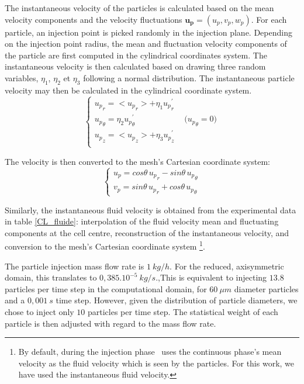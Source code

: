 \begin{itemize}
The instantaneous velocity of the particles is calculated based on the mean velocity components and the velocity fluctuations $\mathbf{u_p}=(u_p,v_p,w_p)$. For each particle, an injection point is picked randomly in the injection plane. Depending on the injection point radius, the mean and fluctuation velocity components of the particle are first computed in the cylindrical coordinates system. The instantaneous velocity is then calculated based on drawing three random variables, $\eta_1$, $\eta_2$ et $\eta_3$ following a normal distribution. The instantaneous particle velocity may then be calculated in the cylindrical coordinate system.
\begin{equation}
   \left\{\begin{array}{l}
      {u_p}_r=<{u_p}_r>+\eta_1 {u_p}_r^\prime \\
      {u_p}_\theta=\eta_2{u_p}_{\theta}^\prime\qquad\qquad\qquad
      \text{(${u_p}_\theta=0$)}               \\
      {u_p}_z=<{u_p}_z>+\eta_3{u_p}_z^\prime  \\
   \end{array}\right.
\end{equation}

The velocity is then converted to the mesh's Cartesian coordinate system:
\begin{equation}
   \left\{\begin{array}{l}
      u_p=cos\theta\, {u_p}_r- sin\theta\, {u_p}_\theta \\
      v_p=sin\theta\, {u_p}_r+ cos\theta\, {u_p}_\theta
   \end{array}\right.
\end{equation}

Similarly, the instantaneous fluid velocity is obtained from the experimental data in table \ref{CL_fluide}: interpolation of the fluid velocity mean and fluctuating components at the cell centre, reconstruction of the instantaneous velocity, and conversion to the mesh's Cartesian coordinate system \footnote{By default, during the injection phase \CS\ uses the continuous phase's mean velocity as the fluid velocity which is seen by the particles. For this work, we have used the instantaneous fluid velocity.}.

\noindent
The particle injection mass flow rate is $1~kg/h$. For the reduced, axisymmetric domain, this translates to $0,385.10^{-5}~kg/s$.,This is equivalent to injecting $13.8$ particles per time step in the computational domain, for $60~\mu m$ diameter particles and a $0,001~s$ time step. However, given the distribution of particle diameters, we chose to inject only $10$ particles per time step. The statistical weight of each particle is then adjusted with regard to the mass flow rate.\\


\end{itemize}
